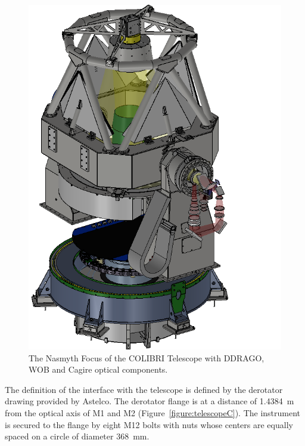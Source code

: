 \documentclass{report}
\newcommand{\TODO}[1]{\textcolor{red}{TODO: #1}}
\begin{document}
\begin{figure}
\begin{center}
\includegraphics[width=\linewidth]{figures/Telescope-DD-Cg-Optics-000.png}
\end{center}
\caption{The Nasmyth Focus of the COLIBRI Telescope with DDRAGO, WOB and Cagire optical components.}
\label{figure:telescopeB}
\end{figure}



The definition of the interface with the telescope is defined by the derotator drawing provided by Astelco. The derotator flange is at a distance of 1.4384~m from the optical axis of M1 and M2 (Figure~\ref{figure:telescopeC}). The instrument is secured to the flange by eight M12 bolts with nuts whose centers are equally spaced on a circle of diameter 368~mm. 
\end{document}
